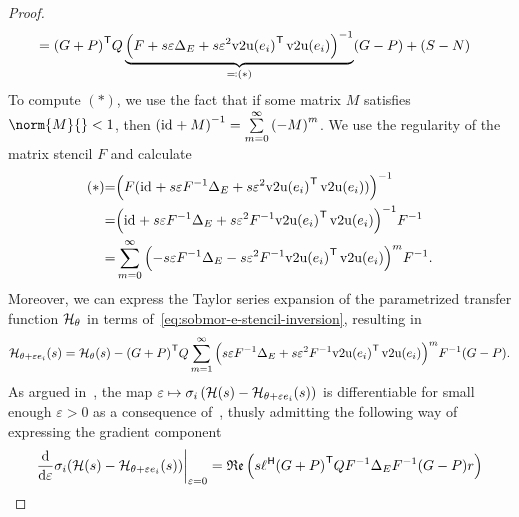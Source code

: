 \begin{proof}
\begin{equation}
\begin{aligned}
             &= {(G + P)}^{\mkern1mu \mathsf{T}} Q \underbrace{{\left( F + s \varepsilon \Delta_E + s \varepsilon^2 {\mathop{}\!\mathrm{v}2\mathrm{u}(e_i)}^{\mkern1mu \mathsf{T}} \mathop{}\!\mathrm{v}2\mathrm{u}(e_i) \right)}^{-1}}_{\eqqcolon (*)} (G - P) + (S - N)
        \end{aligned}
    \end{equation}
    To compute $(*)$, we use the fact that if some matrix $M$ satisfies $\norm{M}{} < 1$, then ${(\text{id}_{} + M)}^{-1} = \sum\limits_{m = 0}^\infty {(-M)}^m$.
    We use the regularity of the matrix stencil $F$ and calculate
    \begin{equation}\label{eq:sobmor-e-stencil-inversion}
        \begin{alignedat}{3}
            &(*) &= &{\left( F (\text{id}_{} + s \varepsilon F^{-1} \Delta_E + s \varepsilon^2 {\mathop{}\!\mathrm{v}2\mathrm{u}(e_i)}^{\mkern1mu \mathsf{T}} \mathop{}\!\mathrm{v}2\mathrm{u}(e_i)) \right)}^{-1} \\
            & &= &{\left( \text{id}_{} + s \varepsilon F^{-1} \Delta_E + s \varepsilon^2 F^{-1} {\mathop{}\!\mathrm{v}2\mathrm{u}(e_i)}^{\mkern1mu \mathsf{T}} \mathop{}\!\mathrm{v}2\mathrm{u}(e_i) \right)}^{-1} F^{-1} \\
            & &= &\sum\limits_{m = 0}^\infty {\left( - s \varepsilon F^{-1} \Delta_E - s \varepsilon^2 F^{-1} {\mathop{}\!\mathrm{v}2\mathrm{u}(e_i)}^{\mkern1mu \mathsf{T}}\mathop{}\!\mathrm{v}2\mathrm{u}(e_i) \right)}^m F^{-1}.
        \end{alignedat}
    \end{equation}
    Moreover, we can express the Taylor series expansion of the parametrized transfer function $\mathcal{H}_\theta$ in terms of~\eqref{eq:sobmor-e-stencil-inversion}, resulting in
    \begin{equation}\label{eq:sobmor-e-taylor}
        \mathcal{H}_{\theta + \varepsilon e_i}(s) = \mathcal{H}_\theta(s) - {(G + P)}^{\mkern1mu \mathsf{T}} Q \sum\limits_{m = 1}^\infty {\left( s \varepsilon F^{-1} \Delta_E + s \varepsilon^2 F^{-1} {\mathop{}\!\mathrm{v}2\mathrm{u}(e_i)}^{\mkern1mu \mathsf{T}}\mathop{}\!\mathrm{v}2\mathrm{u}(e_i) \right)}^m F^{-1} (G - P).
    \end{equation}
    As argued in~\cite[Theorem~1]{Schwerdtner2022}, the map $\varepsilon \mapsto \sigma_i\left( \mathcal{H}(s) - \mathcal{H}_{\theta + \varepsilon e_i}(s) \right)$ is differentiable for small enough $\varepsilon > 0$ as a consequence of~\cite{Lancaster1964}, thusly admitting the following way of expressing the gradient component
    \begin{equation}\label{eq:sobmor-e-trace-form}
        \begin{aligned}
            &\res{\frac{\dif}{\dif \varepsilon} \sigma_i(\mcl{H}(s) - \mcl{H}_{\theta + \varepsilon e_i}(s))}{\varepsilon = 0} = \re{s \ell\herm {(G + P)}\trans Q F\inv \Delta_E F\inv (G - P) r} \\

\end{aligned}
\end{equation}
\end{proof}
